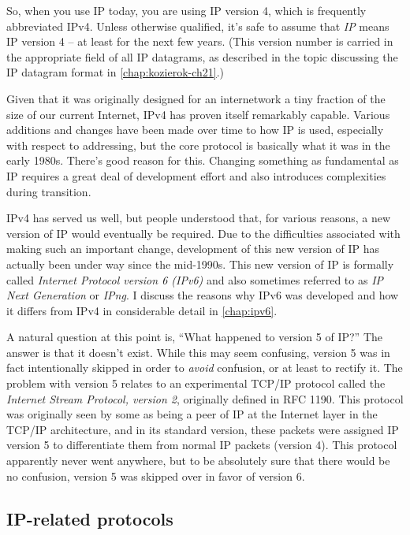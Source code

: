 So, when you use IP today, you are using IP version 4, which is
frequently abbreviated IPv4. Unless otherwise qualified, it's safe to
assume that {\emph{IP}} means IP version 4 -- at least for the next few years.
(This version number is carried in the appropriate field of all IP datagrams, as described in the topic discussing the IP datagram format in \vref{chap:kozierok-ch21}.)

Given that it was originally designed for an internetwork a tiny
fraction of the size of our current Internet, IPv4 has proven itself remarkably capable.
Various additions and changes have been made over
time to how IP is used, especially with respect to addressing, but the
core protocol is basically what it was in the early 1980s. There's good
reason for this. Changing something as fundamental as IP requires a
great deal of development effort and also introduces complexities during
transition.

IPv4 has served us well, but people understood that, for various
reasons, a new version of IP would eventually be required. Due to the
difficulties associated with making such an important change,
development of this new version of IP has actually been under way since
the mid-1990s. This new version of IP is formally called {\emph{Internet
Protocol version 6 (IPv6)}} and also sometimes referred to as {\emph{IP
Next Generation}} or {\emph{IPng}}.
I discuss the reasons why IPv6 was developed and how it differs from IPv4 in considerable detail in \vref{chap:ipv6}.

A natural question at this point is, ``What happened to version 5 of IP?''
The answer is that it doesn't exist. While this may seem confusing,
version 5 was in fact intentionally skipped in order to {\emph{avoid}}
confusion, or at least to rectify it. The problem with version 5 relates
to an experimental TCP/IP protocol called the {\emph{Internet Stream
Protocol, version 2}}, originally defined in RFC 1190. This protocol was
originally seen by some as being a peer of IP at the Internet layer in
the TCP/IP architecture, and in its standard version, these packets were
assigned IP version 5 to differentiate them from normal IP packets
(version 4). This protocol apparently never went anywhere, but to be
absolutely sure that there would be no confusion, version 5 was skipped
over in favor of version 6.




\subsection{IP-related protocols}


